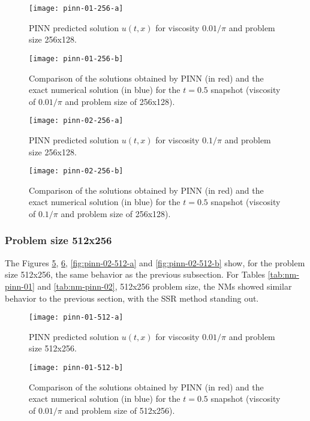 \documentclass[conference]{IEEEtran}
\begin{document}
\begin{figure}[htb]\centering
\texttt{[image: pinn-01-256-a]}
\caption{PINN predicted solution $u(t, x)$ for viscosity ${0.01}/{\pi}$ and problem size 256x128.}
\label{fig:pinn-01-256-a}
\end{figure}

\begin{figure}[htb]\centering
\texttt{[image: pinn-01-256-b]}
\caption{Comparison of the solutions obtained by PINN (in red) and the exact numerical solution (in blue) for the $t=0.5$ snapshot (viscosity of ${0.01}/{\pi}$ and problem size of 256x128).}
\label{fig:pinn-01-256-b}
\end{figure}

\begin{figure}[htb]\centering
\texttt{[image: pinn-02-256-a]}
\caption{PINN predicted solution $u(t, x)$ for viscosity ${0.1}/{\pi}$ and problem size 256x128.}
\label{fig:pinn-02-256-a}
\end{figure}

\begin{figure}[htb]\centering
\texttt{[image: pinn-02-256-b]}
\caption{Comparison of the solutions obtained by PINN (in red) and the exact numerical solution (in blue) for the $t=0.5$ snapshot (viscosity of ${0.1}/{\pi}$ and problem size of 256x128).}
\label{fig:pinn-02-256-b}
\end{figure}

\subsubsection{Problem size 512x256}

The Figures \ref{fig:pinn-01-512-a}, \ref{fig:pinn-01-512-b}, \ref{fig:pinn-02-512-a} and \ref{fig:pinn-02-512-b} show, for the problem size 512x256, the same behavior as the previous subsection.
For Tables \ref{tab:nm-pinn-01} and \ref{tab:nm-pinn-02}, 512x256 problem size, the NMs showed similar behavior to the previous section, with the SSR method standing out.

\begin{figure}[htb]\centering
\texttt{[image: pinn-01-512-a]}
\caption{PINN predicted solution $u(t, x)$ for viscosity ${0.01}/{\pi}$ and problem size 512x256.}
\label{fig:pinn-01-512-a}
\end{figure}

\begin{figure}[htb]\centering
\texttt{[image: pinn-01-512-b]}
\caption{Comparison of the solutions obtained by PINN (in red) and the exact numerical solution (in blue) for the $t=0.5$ snapshot (viscosity of ${0.01}/{\pi}$ and problem size of 512x256).}
\label{fig:pinn-01-512-b}
\end{figure}
\end{document}
